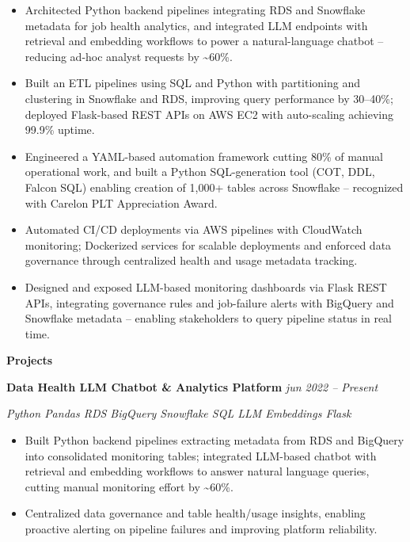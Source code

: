\documentclass[
]{article}
\begin{document}
\begin{itemize}
\item
  Architected Python backend pipelines integrating RDS and Snowflake
  metadata for job health analytics, and integrated LLM endpoints with
  retrieval and embedding workflows to power a natural-language chatbot
  -- reducing ad-hoc analyst requests by \textasciitilde60\%.
\item
  Built an ETL pipelines using SQL and Python with
  partitioning and clustering in Snowflake and RDS, improving query
  performance by 30--40\%; deployed Flask-based REST APIs on AWS EC2
  with auto-scaling achieving 99.9\% uptime.
\item
  Engineered a YAML-based automation framework cutting 80\% of manual
  operational work, and built a Python SQL-generation tool (COT, DDL,
  Falcon SQL) enabling creation of 1,000+ tables across Snowflake --
  recognized with Carelon PLT Appreciation Award.
\item
  Automated CI/CD deployments via AWS pipelines with CloudWatch
  monitoring; Dockerized services for scalable deployments and enforced
  data governance through centralized health and usage metadata
  tracking.
\item
  Designed and exposed LLM-based monitoring dashboards via Flask REST
  APIs, integrating governance rules and job-failure alerts with
  BigQuery and Snowflake metadata -- enabling stakeholders to query
  pipeline status in real time.
\end{itemize}
\vspace{-0.2em}

\begin{center}\textbf{Projects}\end{center}
\vspace{-0.5em}

\textbf{Data Health LLM Chatbot \& Analytics Platform} \hfill \emph{jun 2022 -- Present}
\vspace{-0.5em}

\emph{Python \textbar{} Pandas \textbar{} RDS \textbar{} BigQuery
\textbar{} Snowflake \textbar{} SQL \textbar{} LLM \textbar{} Embeddings
\textbar{} Flask}

\begin{itemize}
\item
  Built Python backend pipelines extracting metadata from RDS and
  BigQuery into consolidated monitoring tables; integrated LLM-based
  chatbot with retrieval and embedding workflows to answer natural
  language queries, cutting manual monitoring effort by
  \textasciitilde60\%.
\item
  Centralized data governance and table health/usage insights, enabling
  proactive alerting on pipeline failures and improving platform
  reliability.
\end{itemize}
\end{document}
